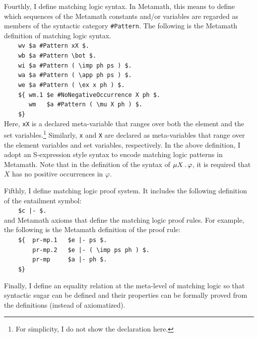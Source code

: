 \documentclass[11pt]{article}
\begin{document}
Fourthly, I define matching logic syntax. 
In Metamath, this means to define which sequences of the Metamath constants 
and/or variables are regarded as members of the syntactic category 
\verb|#Pattern|. 
The following is the Metamath definition of matching logic syntax.\\
\verb|    |\verb|wv $a #Pattern xX $. | \\
\verb|    |\verb|wb $a #Pattern \bot $.| \\
\verb|    |\verb|wi $a #Pattern ( \imp ph ps ) $.| \\
\verb|    |\verb|wa $a #Pattern ( \app ph ps ) $.| \\
\verb|    |\verb|we $a #Pattern ( \ex x ph ) $.| \\
\verb|    |\verb|${ wm.1 $e #NoNegativeOccurrence X ph $.| \\
\verb|    |\verb|   wm   $a #Pattern ( \mu X ph ) $.| \\
\verb|    |\verb|$}| \\
Here, \verb|xX| is a declared meta-variable that ranges over both the element 
and the set variables.\footnote{For simplicity, I do not show the declaration here. 
}
Similarly, \verb|x| and \verb|X| are declared as meta-variables that range over 
the element variables and set variables, respectively. 
In the above definition, I adopt an S-expression style syntax to encode 
matching logic patterns in Metamath. 
Note that in the definition of the syntax of $\mu X \,.\, \varphi$, it is 
required that $X$ has no positive occurrences in $\varphi$. 

Fifthly, I define matching logic proof system. 
It includes the following definition of the entailment symbol:\\
\verb|    |\verb#$c |- $.# \\
and Metamath axioms that define the matching logic proof rules. 
For example, the following is the Metamath definition of the 
 proof rule: \\
\verb|    |\verb#${  pr-mp.1   $e |- ps $.# \\
\verb|    |\verb#    pr-mp.2   $e |- ( \imp ps ph ) $.# \\
\verb|    |\verb#    pr-mp     $a |- ph $.# \\
\verb|    |\verb#$}# 

Finally, I define an equality relation at the meta-level of matching logic so 
that syntactic sugar can be defined and their properties can be formally proved
from the definitions (instead of axiomatized). 
\end{document}
